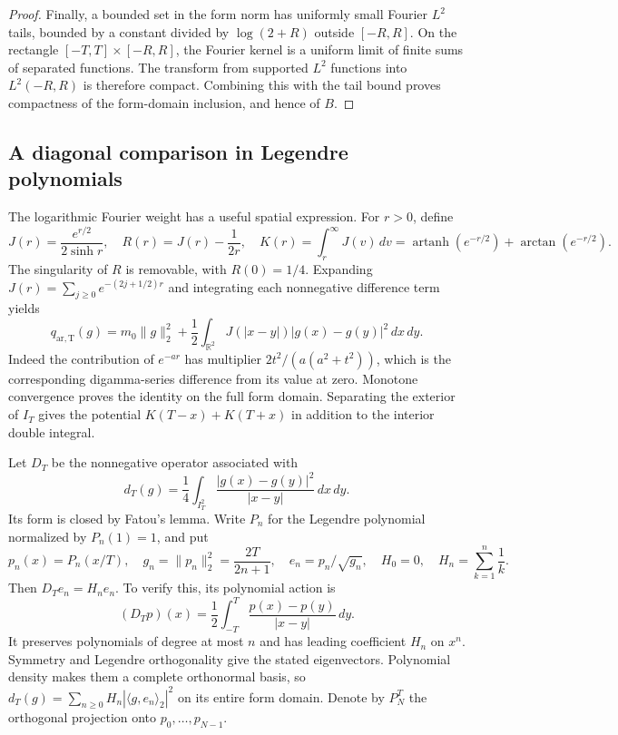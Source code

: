 \documentclass[11pt]{article}
\theoremstyle{definition}
\theoremstyle{remark}
\numberwithin{equation}{section}
\newcommand{\R}{\mathbb R}
\begin{document}
\begin{proof}
Finally, a bounded set in the form norm has uniformly small Fourier
$L^2$ tails, bounded by a constant divided by $\log(2+R)$ outside
$[-R,R]$.  On the rectangle $[-T,T]\times[-R,R]$, the Fourier
kernel is a uniform limit of finite sums of separated functions.
The transform from supported $L^2$ functions into $L^2(-R,R)$
is therefore compact.  Combining this with the tail bound proves
compactness of the form-domain inclusion, and hence of $B$.
\end{proof}

\subsection{A diagonal comparison in Legendre polynomials}

The logarithmic Fourier weight has a useful spatial expression.  For
$r>0$, define
\begin{equation}
 J(r)=\frac{e^{r/2}}{2\sinh r},\quad
 R(r)=J(r)-\frac1{2r},\quad
 K(r)=\int_r^\infty J(v)\,dv
     =\operatorname{artanh}(e^{-r/2})+\arctan(e^{-r/2}).
 \label{eq:window-kernels}
\end{equation}
The singularity of $R$ is removable, with $R(0)=1/4$.
Expanding $J(r)=\sum_{j\ge0}e^{-(2j+1/2)r}$ and integrating
each nonnegative difference term yields
\begin{equation}
 q_{\mathrm{ar,T}}(g)=m_0\|g\|_2^2+
 \frac12\int_{\R^2}J(|x-y|)|g(x)-g(y)|^2\,dx\,dy.
 \label{eq:window-jump-form}
\end{equation}
Indeed the contribution of $e^{-ar}$ has multiplier
$2t^2/(a(a^2+t^2))$, which is the corresponding digamma-series
difference from its value at zero.  Monotone convergence proves
the identity on the full form domain.  Separating the exterior of
$I_T$ gives the potential $K(T-x)+K(T+x)$ in addition to the
interior double integral.

Let $D_T$ be the nonnegative operator associated with
\[
 d_T(g)=\frac14\int_{I_T^2}
             \frac{|g(x)-g(y)|^2}{|x-y|}\,dx\,dy.
\]
Its form is closed by Fatou's lemma.  Write $P_n$ for the Legendre
polynomial normalized by $P_n(1)=1$, and put
\begin{equation}
 p_n(x)=P_n(x/T),\quad
 g_n=\|p_n\|_2^2=\frac{2T}{2n+1},\quad
 e_n=p_n/\sqrt{g_n},\quad
 H_0=0,\quad H_n=\sum_{k=1}^n\frac1k.
 \label{eq:window-legendre}
\end{equation}
Then $D_Te_n=H_ne_n$.  To verify this, its polynomial action is
\[
 (D_Tp)(x)=\frac12\int_{-T}^T\frac{p(x)-p(y)}{|x-y|}\,dy.
\]
It preserves polynomials of degree at most $n$ and has leading
coefficient $H_n$ on $x^n$.  Symmetry and Legendre orthogonality
give the stated eigenvectors.  Polynomial density makes them a
complete orthonormal basis, so
$d_T(g)=\sum_{n\ge0}H_n|\langle g,e_n\rangle_2|^2$ on its
entire form domain.  Denote by $P_N^T$ the orthogonal projection
onto $p_0,\ldots,p_{N-1}$.
\end{document}
